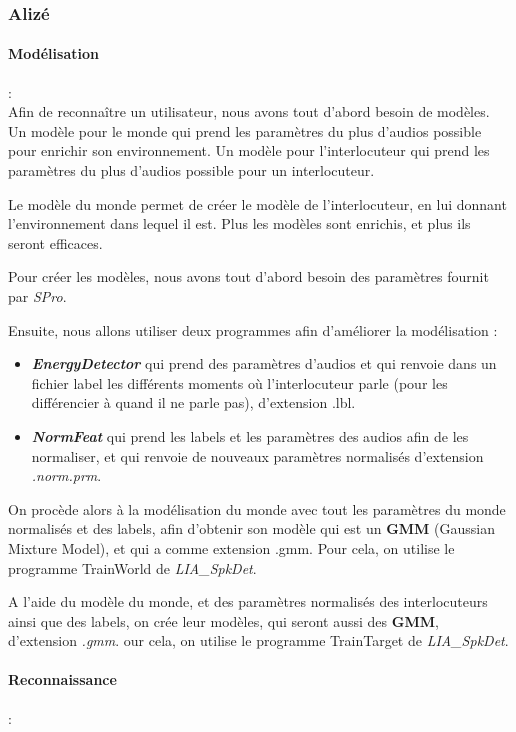 \subsubsection{Alizé}
\label{sec:alizeImpl}


\paragraph*{Modélisation} : \\

Afin de reconnaître un utilisateur, nous avons tout d'abord besoin de modèles.
Un modèle pour le monde qui prend les paramètres du plus d'audios possible pour enrichir son environnement.
Un modèle pour l'interlocuteur qui prend les paramètres du plus d'audios possible pour un interlocuteur.

Le modèle du monde permet de créer le modèle de l'interlocuteur, en lui donnant l'environnement dans lequel il est.
Plus les modèles sont enrichis, et plus ils seront efficaces.

Pour créer les modèles, nous avons tout d'abord besoin des paramètres fournit par \textit{SPro}.

Ensuite, nous allons utiliser deux programmes afin d'améliorer la modélisation :
\begin{itemize}
      \item  \textit{\textbf{EnergyDetector}} qui prend des paramètres d'audios et qui renvoie dans un fichier label les différents moments où
            l'interlocuteur parle (pour les différencier à quand il ne parle pas), d'extension .lbl.
      \item\textit{\textbf{ NormFeat }} qui prend les labels et les paramètres des audios afin de les normaliser, et qui renvoie de
            nouveaux paramètres normalisés d'extension \textit{.norm.prm}.
\end{itemize}


On procède alors à la modélisation du monde avec tout les paramètres du monde normalisés et des labels, afin d'obtenir son modèle qui est un \textbf{GMM}
(Gaussian Mixture Model), et qui a comme extension .gmm.
Pour cela, on utilise le programme TrainWorld de \textit{  LIA\_SpkDet}.

A l'aide du modèle du monde, et des paramètres normalisés des interlocuteurs ainsi que des labels, on crée leur modèles, qui seront aussi des \textbf{GMM},
d'extension \textit{.gmm}.
our cela, on utilise le programme TrainTarget de \textit{ LIA\_SpkDet}.


\paragraph*{Reconnaissance} : \\

